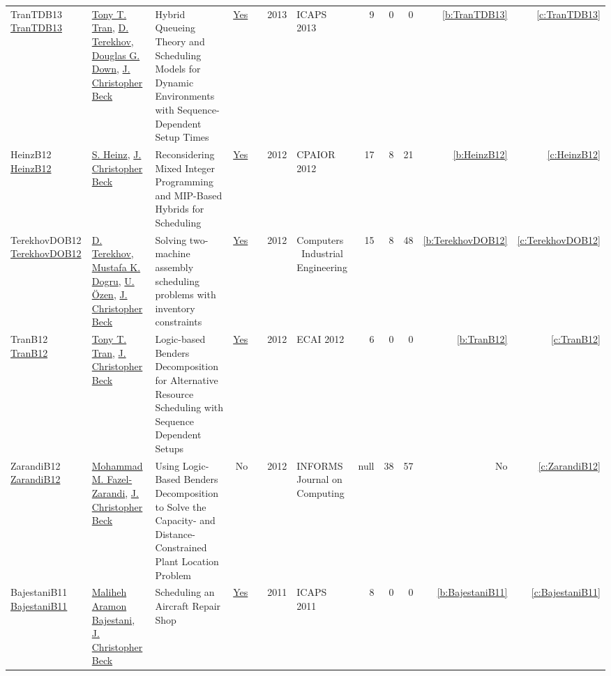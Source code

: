{\begin{longtable}{>{\raggedright\arraybackslash}p{3cm}>{\raggedright\arraybackslash}p{6cm}>{\raggedright\arraybackslash}p{6.5cm}rrrp{2.5cm}rrrrr}
TranTDB13 \href{http://www.aaai.org/ocs/index.php/ICAPS/ICAPS13/paper/view/6005}{TranTDB13} & \hyperref[auth:a811]{Tony T. Tran}, \hyperref[auth:a830]{D. Terekhov}, \hyperref[auth:a815]{Douglas G. Down}, \hyperref[auth:a89]{J. Christopher Beck} & Hybrid Queueing Theory and Scheduling Models for Dynamic Environments with Sequence-Dependent Setup Times & \href{../works/TranTDB13.pdf}{Yes} & \cite{TranTDB13} & 2013 & ICAPS 2013 & 9 & 0 & 0 & \ref{b:TranTDB13} & \ref{c:TranTDB13}\\
HeinzB12 \href{https://doi.org/10.1007/978-3-642-29828-8\_14}{HeinzB12} & \hyperref[auth:a134]{S. Heinz}, \hyperref[auth:a89]{J. Christopher Beck} & Reconsidering Mixed Integer Programming and MIP-Based Hybrids for Scheduling & \href{../works/HeinzB12.pdf}{Yes} & \cite{HeinzB12} & 2012 & CPAIOR 2012 & 17 & 8 & 21 & \ref{b:HeinzB12} & \ref{c:HeinzB12}\\
TerekhovDOB12 \href{https://doi.org/10.1016/j.cie.2012.02.006}{TerekhovDOB12} & \hyperref[auth:a830]{D. Terekhov}, \hyperref[auth:a832]{Mustafa K. Dogru}, \hyperref[auth:a833]{U. {\"{O}}zen}, \hyperref[auth:a89]{J. Christopher Beck} & Solving two-machine assembly scheduling problems with inventory constraints & \href{../works/TerekhovDOB12.pdf}{Yes} & \cite{TerekhovDOB12} & 2012 & Computers \  Industrial Engineering & 15 & 8 & 48 & \ref{b:TerekhovDOB12} & \ref{c:TerekhovDOB12}\\
TranB12 \href{https://doi.org/10.3233/978-1-61499-098-7-774}{TranB12} & \hyperref[auth:a811]{Tony T. Tran}, \hyperref[auth:a89]{J. Christopher Beck} & Logic-based Benders Decomposition for Alternative Resource Scheduling with Sequence Dependent Setups & \href{../works/TranB12.pdf}{Yes} & \cite{TranB12} & 2012 & ECAI 2012 & 6 & 0 & 0 & \ref{b:TranB12} & \ref{c:TranB12}\\
ZarandiB12 \href{http://dx.doi.org/10.1287/ijoc.1110.0458}{ZarandiB12} & \hyperref[auth:a967]{Mohammad M. Fazel-Zarandi}, \hyperref[auth:a89]{J. Christopher Beck} & Using Logic-Based Benders Decomposition to Solve the Capacity- and Distance-Constrained Plant Location Problem & No & \cite{ZarandiB12} & 2012 & INFORMS Journal on Computing & null & 38 & 57 & No & \ref{c:ZarandiB12}\\
BajestaniB11 \href{http://aaai.org/ocs/index.php/ICAPS/ICAPS11/paper/view/2680}{BajestaniB11} & \hyperref[auth:a829]{Maliheh Aramon Bajestani}, \hyperref[auth:a89]{J. Christopher Beck} & Scheduling an Aircraft Repair Shop & \href{../works/BajestaniB11.pdf}{Yes} & \cite{BajestaniB11} & 2011 & ICAPS 2011 & 8 & 0 & 0 & \ref{b:BajestaniB11} & \ref{c:BajestaniB11}\\

\end{longtable}}

